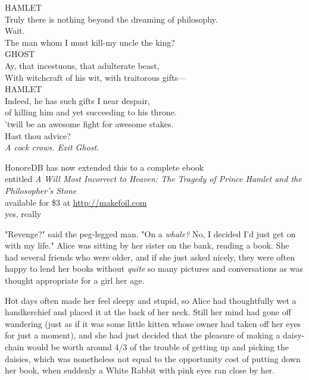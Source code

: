 \noindent{}HAMLET\\
Truly there is nothing beyond the dreaming of philosophy.\\
Wait.\\
The man whom I must kill-my uncle the king?\\

\noindent{}GHOST\\
Ay, that incestuous, that adulterate beast,\\
With witchcraft of his wit, with traitorous gifts---\\

\noindent{}HAMLET\\
Indeed, he has such gifts I near despair,\\
of killing him and yet succeeding to his throne.\\
'twill be an awesome fight for awesome stakes.\\
Hast thou advice?\\

\emph{A cock crows. Exit Ghost.}

\begin{center}
HonoreDB has now extended this to a complete ebook\\
entitled \emph{A Will Most Incorrect to Heaven: The Tragedy of Prince Hamlet and 
the Philosopher's Stone}\\
available for \$3 at \url{http://makefoil.com}\\
yes, really
\end{center}
\sbreak
"Revenge?" said the peg-legged man. "On a \emph{whale?} No, I decided I'd just 
get on with my life."
\sbreak
Alice was sitting by her sister on the bank, reading a book. She had several 
friends who were older, and if she just asked nicely, they were often happy to 
lend her books without \emph{quite} so many pictures and conversations as was 
thought appropriate for a girl her age.

Hot days often made her feel sleepy and stupid, so Alice had thoughtfully wet a 
handkerchief and placed it at the back of her neck. Still her mind had gone off 
wandering (just as if it was some little kitten whose owner had taken off her 
eyes for just a moment), and she had just decided that the pleasure of making a 
daisy-chain would be worth around 4/3 of the trouble of getting up and picking 
the daisies, which was nonetheless not equal to the opportunity cost of putting 
down her book, when suddenly a White Rabbit with pink eyes ran close by her.

